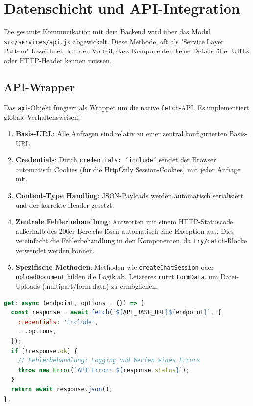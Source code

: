\section{Datenschicht und API-Integration}
Die gesamte Kommunikation mit dem Backend wird über das Modul \texttt{src/services/api.js} abgewickelt. Diese Methode, oft als "Service Layer Pattern" bezeichnet, hat den Vorteil, dass Komponenten keine Details über URLs oder HTTP-Header kennen müssen.

\subsection{API-Wrapper}
Das \texttt{api}-Objekt fungiert als Wrapper um die native \texttt{fetch}-API. Es implementiert globale Verhaltensweisen:

\begin{enumerate}
    \item \textbf{Basis-URL}: Alle Anfragen sind relativ zu einer zentral konfigurierten Basis-URL
    \item \textbf{Credentials}: Durch \texttt{credentials: 'include'} sendet der Browser automatisch Cookies (für die HttpOnly Session-Cookies) mit jeder Anfrage mit.
    \item \textbf{Content-Type Handling}: JSON-Payloads werden automatisch serialisiert und der korrekte Header gesetzt.
    \item \textbf{Zentrale Fehlerbehandlung}: Antworten mit einem HTTP-Statuscode außerhalb des 200er-Bereichs lösen automatisch eine Exception aus. Dies vereinfacht die Fehlerbehandlung in den Komponenten, da \texttt{try/catch}-Blöcke verwendet werden können.
    \item \textbf{Spezifische Methoden}: Methoden wie \texttt{createChatSession} oder \texttt{uploadDocument} bilden die Logik ab. Letzteres nutzt \texttt{FormData}, um Datei-Uploads (multipart/form-data) zu ermöglichen.
\end{enumerate}

\begin{lstlisting}[language=JavaScript, caption={GET-Methode im API-Service}]
get: async (endpoint, options = {}) => {
  const response = await fetch(`${API_BASE_URL}${endpoint}`, {
    credentials: 'include',
    ...options,
  });
  if (!response.ok) {
    // Fehlerbehandlung: Logging und Werfen eines Errors
    throw new Error(`API Error: ${response.status}`);
  }
  return await response.json();
},
\end{lstlisting}
